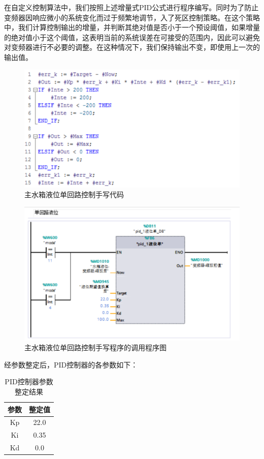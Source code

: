 \documentclass[UTF8]{article}
\begin{document}
在自定义控制算法中，我们按照上述增量式PID公式进行程序编写。同时为了防止变频器因响应微小的系统变化而过于频繁地调节，入了死区控制策略。在这个策略中，我们计算控制输出的增量，并判断其绝对值是否小于一个预设阈值，如果增量的绝对值小于这个阈值，这表明当前的系统误差在可接受的范围内，因此可以避免对变频器进行不必要的调整。在这种情况下，我们保持输出不变，即使用上一次的输出值。
\begin{figure}[H]
    \centering %
    \includegraphics[width=.8\textwidth]{figure/单回路控制-自写程序-代码.png} 
    \caption{主水箱液位单回路控制手写代码} %
\end{figure}
\begin{figure}[H]
    \centering %
    \includegraphics[width=.8\textwidth]{figure/单回路控制-自写程序-调用程序图.png} 
    \caption{主水箱液位单回路控制手写程序的调用程序图} %
\end{figure}

经参数整定后，PID控制器的各参数如下：
\begin{table}[H] %
\centering %
\begin{tabular}{cc} %
    \toprule %
    参数 & 整定值 \\
    \midrule %
    Kp & 22.0 \\
    Ki & 0.35 \\
    Kd & 0.0 \\
    \bottomrule %
\end{tabular}
\caption{PID控制器参数整定结果} %
\end{table}
\end{document}
